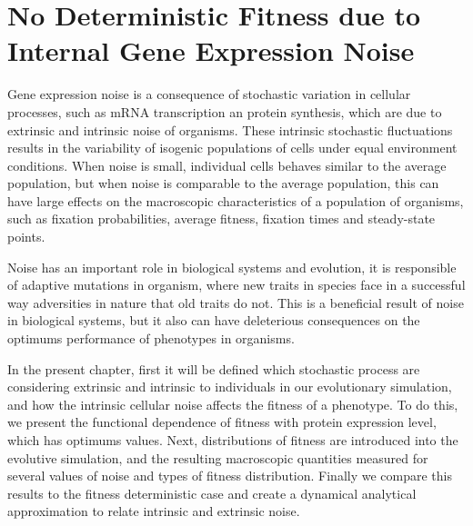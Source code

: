 \chapter{No Deterministic Fitness due to Internal Gene Expression Noise}
\ifpdf
    \graphicspath{{NoDeterministic/Figs/PNG/}{NoDeterministic/Figs/PDF/}{NoDeterministic/Figs/}}
\else
    \graphicspath{{NoDeterministic/Figs/EPS/}{NoDeterministic/Figs/}}
\fi
{}

Gene expression noise is a consequence of  stochastic variation in cellular processes, such as mRNA transcription an protein synthesis, which are due to extrinsic and intrinsic noise of organisms\cite{Hilfinger2011,Paulsson2004}. These intrinsic stochastic fluctuations results in the variability of isogenic populations of cells under equal environment conditions\cite{Wang2011}. When noise is small, individual cells behaves similar to the average population, but when noise is comparable to the average population, this can have large effects on the macroscopic characteristics of a population of organisms, such as fixation probabilities, average fitness, fixation times and steady-state points\cite{Mettetal2008}.
            
Noise has an important role in biological systems and evolution, it is responsible of adaptive mutations in organism, where new traits in species face in a  successful way adversities in nature that old traits do not. This is a  beneficial result of noise in biological systems, but it also can have deleterious consequences on the optimums performance of phenotypes in organisms.

In the present chapter, first it will be defined which stochastic process are considering extrinsic and intrinsic to individuals in our evolutionary simulation, and how the intrinsic cellular noise affects the fitness of a phenotype. To do this, we present the functional dependence of fitness with protein expression level, which has optimums values. Next, distributions of fitness are introduced into the evolutive simulation, and the resulting macroscopic quantities measured for several values of noise and types of fitness distribution. Finally we compare this results to the fitness deterministic case and create a dynamical   analytical approximation  to relate intrinsic and extrinsic noise.    
